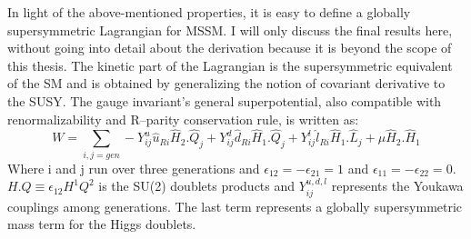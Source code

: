 In light of the above-mentioned properties, it is easy to define a globally supersymmetric Lagrangian for MSSM. I will only discuss the final results here, without going into detail about the derivation because it is beyond the scope of this thesis. The kinetic part of the Lagrangian is the supersymmetric equivalent of the SM and is obtained by generalizing the notion of covariant derivative to the SUSY. The gauge invariant’s general superpotential, also compatible with renormalizability and R–parity conservation rule, is written as:
\begin{equation}\label{equ:mssmpotential}
W = \sum_{i,j=gen}-Y_{ij}^{u}\hat{u}_{Ri}\hat{H}_{2}.\hat{Q}_{j} + Y_{ij}^{d}\hat{d}_{Ri}\hat{H}_{1}.\hat{Q}_{j} + Y_{ij}^{l}\hat{l}_{Ri}\hat{H}_{1}.\hat{L}_{j} + \mu \hat{H}_{2}.\hat{H}_{1}
\end{equation}
Where i and j run over three generations and $\epsilon_{12}=-\epsilon_{21}=1$ and $\epsilon_{11}=-\epsilon_{22}=0$. $H . Q \equiv \epsilon_{12}H^{1}Q^{2}$ is the SU(2) doublets products and $Y_{ij}^{u,d,l}$ represents the Youkawa couplings among generations. The last term represents a globally supersymmetric mass term for the Higgs doublets.

